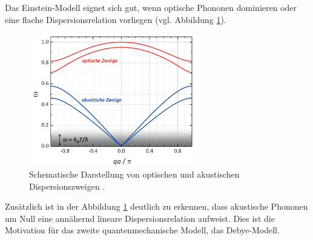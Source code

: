 Das Einstein-Modell eignet sich gut, wenn optische Phononen dominieren oder eine
flache Dispersionsrelation vorliegen (vgl. Abbildung \ref{fig: dispersions_relation}).
\begin{figure}
  \centering
  \includegraphics[width = 0.65\textwidth]{./content/images/optische_akustische.PNG}
  \caption{Schematische Darstellung von optischen und akustischen Dispersionszweigen \cite[S. 223]{marx}.}
  \label{fig: dispersions_relation}
\end{figure}
Zusätzlich ist in der Abbildung \ref{fig: dispersions_relation} deutlich zu erkennen,
dass akustische Phononen um Null eine annähernd lineare Dispersionsrelation aufweist.
Dies ist die Motivation für das zweite quantenmechanische Modell, das
Debye-Modell.

